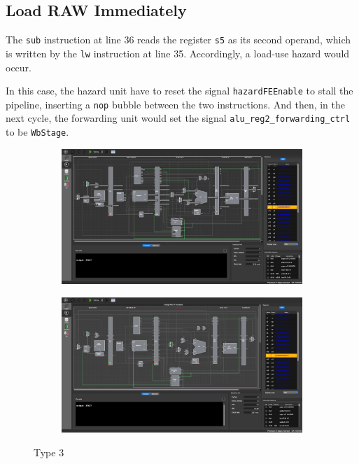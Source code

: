 \documentclass[12pt, a4paper]{article}
\begin{document}
\pagebreak[4]

\subsection{Load RAW Immediately}

The \texttt{sub} instruction at line 36 reads the register \texttt{s5} as its second operand, which is written by the \texttt{lw} instruction at line 35. Accordingly, a load-use hazard would occur.

In this case, the hazard unit have to reset the signal \texttt{hazardFEEnable} to stall the pipeline, inserting a \texttt{nop} bubble between the two instructions. And then, in the next cycle, the forwarding unit would set the signal \texttt{alu\_reg2\_forwarding\_ctrl} to be \texttt{WbStage}.

\begin{figure}[htbp]
\begin{subfigure}{\linewidth}
\centering
\includegraphics[width=.88\linewidth]{3a}
\caption{}
\label{fig:3a}
\end{subfigure}
\begin{subfigure}{\linewidth}
\centering
\includegraphics[width=.88\linewidth]{3b}
\caption{}
\label{fig:3b}
\end{subfigure}
\caption{Type 3}
\label{fig:3}
\end{figure}
\end{document}
